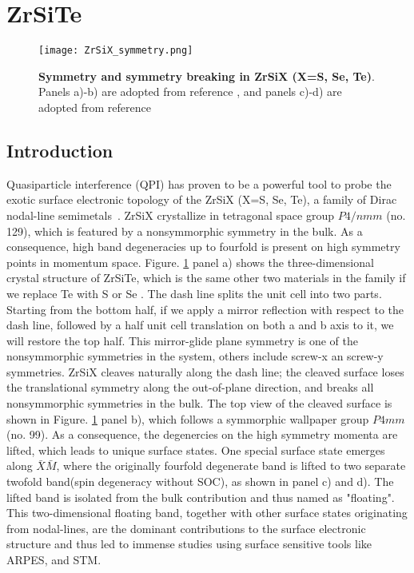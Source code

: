 \section{ZrSiTe}
\begin{figure}
	\texttt{[image: ZrSiX\_symmetry.png]} 
	\centering
	\caption[\textbf{Symmetry and symmetry breaking in ZrSiX (X=S, Se, Te)}]{\textbf{Symmetry and symmetry breaking in ZrSiX (X=S, Se, Te)}. Panels a)-b) are adopted from reference \cite{stuartScanningTunnellingMicroscopy2021}, and panels c)-d) are adopted from reference \cite{toppSurfaceFloating2D2017}}
	\label{fig:ZrSiX_symm}
\end{figure}
\subsection{Introduction}
Quasiparticle interference (QPI) has proven to be a powerful tool to probe the exotic surface electronic topology of the ZrSiX (X=S, Se, Te), a family of Dirac nodal-line semimetals~\cite{muechlerModularArithmeticNodal2020}. ZrSiX crystallize in tetragonal space group $P4/nmm$ (no. 129), which is featured by a nonsymmorphic symmetry in the bulk. As a consequence, high band degeneracies up to fourfold is present on high symmetry points in momentum space. Figure. \ref{fig:ZrSiX_symm} panel a) shows the three-dimensional crystal structure of ZrSiTe, which is the same other two materials in the family if we replace Te with S or Se \cite{stuartQuasiparticleInterferenceObservation2022}. The dash line splits the unit cell into two parts. Starting from the bottom half, if we apply a mirror reflection with respect to the dash line, followed by a half unit cell translation on both a and b axis to it, we will restore the top half. This mirror-glide plane symmetry is one of the nonsymmorphic symmetries in the system, others include screw-x an screw-y symmetries. ZrSiX cleaves naturally along the dash line; the cleaved surface loses the translational symmetry along the out-of-plane direction, and breaks all nonsymmorphic symmetries in the bulk. The top view of the cleaved surface is shown in Figure. \ref{fig:ZrSiX_symm} panel b), which follows a symmorphic wallpaper group $P4mm$ (no. 99). As a consequence, the degenercies on the high symmetry momenta are lifted, which leads to unique surface states. One special surface state emerges along  $\bar{X}\bar{M}$, where the originally fourfold degenerate band is lifted to two separate twofold band(spin degeneracy without SOC), as shown in panel c) and d)\cite{toppSurfaceFloating2D2017}. The lifted band is isolated from the bulk contribution and thus named as "floating". This two-dimensional floating band, together with other surface states originating from nodal-lines, are the dominant contributions to the surface electronic structure and thus led to immense studies using surface sensitive tools like \ac{ARPES}\cite{toppSurfaceFloating2D2017}\cite{toppNonsymmorphicBandDegeneracy2016}, and \ac{STM}\cite{lodgeObservationEffectivePseudospin2017}\cite{zhuQuasiparticleInterferenceNonsymmorphic2018}\cite{butlerQuasiparticleInterferenceZrSiS2017}\cite{buVisualizationElectronicTopology2018}\cite{stuartQuasiparticleInterferenceObservation2022}. 


